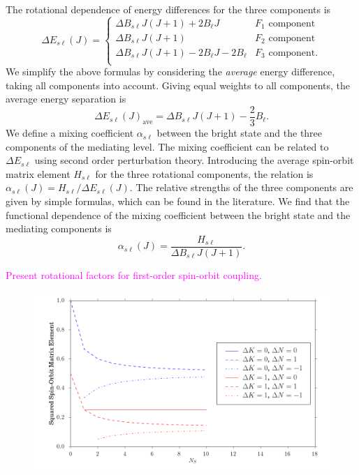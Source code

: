 \documentclass[12pt,draft]{mitthesis}
\newcommand{\POINT}[1]{\textcolor{magenta}{#1}}
\begin{document}
The rotational dependence of energy differences for the three
components is
\begin{equation}
  \Delta E_{s\ell}(J) = 
  \begin{cases}
    \Delta B_{s\ell}J(J+1) + 2B_{\ell}J           & F_1 \text{ component}\\
    \Delta B_{s\ell}J(J+1)                      & F_2 \text{ component}\\
    \Delta B_{s\ell}J(J+1) - 2B_{\ell}J - 2B_{\ell} & F_3 \text{ component}.\\
  \end{cases}
\end{equation}
We simplify the above formulas by considering the \emph{average}
energy difference, taking all components into account.  Giving equal
weights to all components, the average energy separation is
\begin{equation}
  \Delta E_{s\ell}(J)_{\text{ave}} = \Delta B_{s\ell}J(J+1) - \frac{2}{3}B_{\ell}.
\end{equation}
We define a mixing coefficient $\alpha_{s\ell}$ between the bright
state and the three components of the mediating level.  The mixing
coefficient can be related to $\Delta E_{s\ell}$ using second order
perturbation theory.  Introducing the average spin-orbit matrix
element $H_{s\ell}$ for the three rotational components, the relation
is $\alpha_{s\ell}(J) = H_{s\ell} / \Delta E_{s\ell}(J)$.  The
relative strengths of the three components are given by simple
formulas, which can be found in the literature.  We find that the
functional dependence of the mixing coefficient between the bright
state and the mediating components is
\begin{equation}
  \alpha_{s\ell}(J) = \frac{H_{s\ell}}{\Delta B_{s\ell}J(J+1)}.
\end{equation}

\POINT{Present rotational factors for first-order spin-orbit
  coupling.}

\begin{figure}
  \caption{}
  \label{fig:rotational-factors-0}
  \centering
  \includegraphics[width=6in]{rotational_factors_k0.png}
\end{figure}
\end{document}
